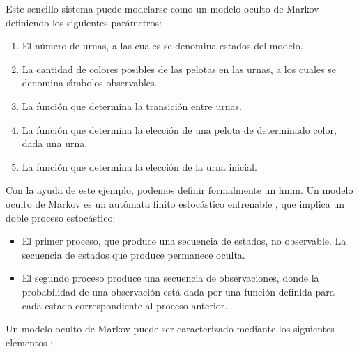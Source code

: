 Este sencillo sistema puede modelarse como un modelo oculto de Markov definiendo los siguientes par\'ametros:
\begin{enumerate}
	\item El n\'umero de urnas, a las cuales se denomina estados del modelo.
	\item La cantidad de colores posibles de las pelotas en las urnas, a los cuales se 
	denomina s{\'\i}mbolos observables.
	\item La funci\'on que determina la transici\'on entre urnas.
	\item La funci\'on que determina la elecci\'on de una pelota de determinado color, dada una urna.
	\item La funci\'on que determina la elecci\'on de la urna inicial.
\end{enumerate}

Con la ayuda de este ejemplo, podemos definir formalmente un \gls{hmm}. Un modelo oculto de Markov es un 
aut\'omata finito estoc\'astico entrenable \cite{KouemouHistory2011}, que implica un doble proceso estoc\'astico:

\begin{itemize}
\item El primer proceso, que produce una secuencia de estados, no observable. 
La secuencia de estados que produce permanece oculta.
\item El segundo proceso produce una secuencia de observaciones, donde la probabilidad de 
una observaci\'on est\'a dada por una funci\'on definida para cada estado correspondiente al proceso anterior.
\end{itemize}

Un modelo oculto de Markov puede ser caracterizado mediante los siguientes elementos \cite{Rabiner89atutorial}:

